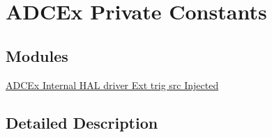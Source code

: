 \hypertarget{group___a_d_c_ex___private___constants}{\section{A\-D\-C\-Ex Private Constants}
\label{group___a_d_c_ex___private___constants}
}
\subsection*{Modules}
\begin{DoxyCompactItemize}
\item 
\hyperlink{group___a_d_c_ex___internal___h_a_l__driver___ext__trig__src___injected}{A\-D\-C\-Ex Internal H\-A\-L driver Ext trig src Injected}
\end{DoxyCompactItemize}


\subsection{Detailed Description}
